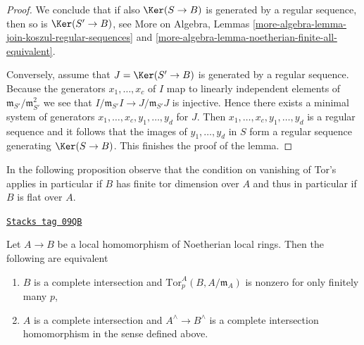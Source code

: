 \begin{proof}
\medskip\noindent
We conclude that if also $\Ker(S \to B)$ is generated by a
regular sequence, then so is $\Ker(S' \to B)$, see
More on Algebra, Lemmas
\ref{more-algebra-lemma-join-koszul-regular-sequences} and
\ref{more-algebra-lemma-noetherian-finite-all-equivalent}.

\medskip\noindent
Conversely, assume that $J = \Ker(S' \to B)$ is generated
by a regular sequence. Because the generators $x_1, \ldots, x_c$
of $I$ map to linearly independent elements of
$\mathfrak m_{S'}/\mathfrak m_{S'}^2$ we see that
$I/\mathfrak m_{S'}I \to J/\mathfrak m_{S'}J$ is injective.
Hence there exists a minimal system of generators
$x_1, \ldots, x_c, y_1, \ldots, y_d$ for $J$.
Then $x_1, \ldots, x_c, y_1, \ldots, y_d$ is a regular sequence
and it follows that the images of $y_1, \ldots, y_d$ in $S$
form a regular sequence generating $\Ker(S \to B)$.
This finishes the proof of the lemma.
\end{proof}

In the following proposition observe that the condition on vanishing of
Tor's applies in particular if $B$ has finite tor dimension over $A$ and
thus in particular if $B$ is flat over $A$.

\begin{proposition}
\label{dpa-proposition-avramov-map}
\href{https://stacks.math.columbia.edu/tag/09QB}{\texttt{Stacks tag 09QB}}

Let $A \to B$ be a local homomorphism of Noetherian local rings.
Then the following are equivalent
\begin{enumerate}
\item $B$ is a complete intersection and
$\text{Tor}^A_p(B, A/\mathfrak m_A)$ is nonzero for only finitely many $p$,
\item $A$ is a complete intersection and
$A^\wedge \to B^\wedge$ is a complete intersection homomorphism
in the sense defined above.
\end{enumerate}
\end{proposition}

